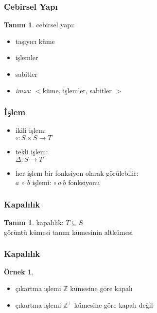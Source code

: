 \documentclass[dvipsnames]{beamer}
\theoremstyle{definition}
\newtheorem{tanim}[theorem]{Tanım}
\theoremstyle{example}
\newtheorem{ornek}[theorem]{Örnek}
\theoremstyle{plain}
\begin{document}
\begin{frame}
  \frametitle{Cebirsel Yapı}

  \begin{tanim}
    \alert{cebirsel yapı}:
    \begin{itemize}
      \item taşıyıcı küme
      \item işlemler
      \item sabitler
    \end{itemize}
  \end{tanim}

  \pause
  \begin{itemize}
    \item \emph{imza}: $<$küme, işlemler, sabitler $>$
  \end{itemize}
\end{frame}

\begin{frame}
  \frametitle{İşlem}

  \begin{itemize}
    \item ikili işlem:\\
      $\circ: S \times S \rightarrow T$

    \item tekli işlem:\\
      $\Delta: S \rightarrow T$

    \pause
    \medskip
    \item her işlem bir fonksiyon olarak görülebilir:\\
      $a~\circ~b$ işlemi: $\circ~a~b$ fonksiyonu
  \end{itemize}
\end{frame}

\begin{frame}
  \frametitle{Kapalılık}

  \begin{tanim}
    \alert{kapalılık}: $T \subseteq S$\\
    görüntü kümesi tanım kümesinin altkümesi
  \end{tanim}
\end{frame}

\begin{frame}
  \frametitle{Kapalılık}

  \begin{ornek}
    \begin{itemize}
      \item çıkartma işlemi $\mathbb{Z}$ kümesine göre kapalı

      \pause
      \item çıkartma işlemi $\mathbb{Z^+}$ kümesine göre kapalı değil
    \end{itemize}
  \end{ornek}
\end{frame}
\end{document}
